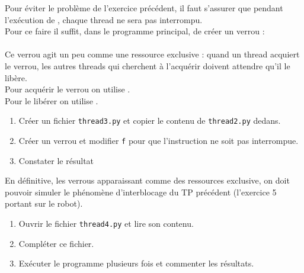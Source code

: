 \documentclass[a4paper,12pt,french]{book}
\begin{document}
\begin{exercice}[]
Pour éviter le problème de l'exercice précédent, il faut s'assurer que pendant l'exécution de , chaque thread ne sera pas interrompu.\\

Pour ce faire il suffit, dans le programme principal, de créer un \og verrou \fg{} :\\
\\
Ce verrou agit un peu comme une ressource exclusive : quand un thread acquiert le verrou, les autres threads qui cherchent à l'acquérir doivent attendre qu'il le libère.\\
Pour acquérir le verrou on utilise .\\
Pour le libérer on utilise .\\
\begin{enumerate}[\bfseries 1.]
	\item 	Créer un fichier \texttt{thread3.py} et copier le contenu de \texttt{thread2.py} dedans.
	\item 	Créer un verrou et modifier \texttt{f} pour que l'instruction  ne soit pas interrompue.
    \item 	Constater le résultat
\end{enumerate}
\end{exercice}

\begin{exercice}[]
En définitive, les verrous apparaissant comme des ressources exclusive, on doit pouvoir simuler le phénomène d'interblocage du TP précédent (l'exercice 5 portant sur le robot).
\begin{enumerate}[\bfseries 1.]
	\item 	Ouvrir le fichier \texttt{thread4.py} et lire son contenu.
	\item 	Compléter ce fichier.
    \item 	Exécuter le programme plusieurs fois et commenter les résultats.
\end{enumerate}
\end{exercice}
\end{document}
